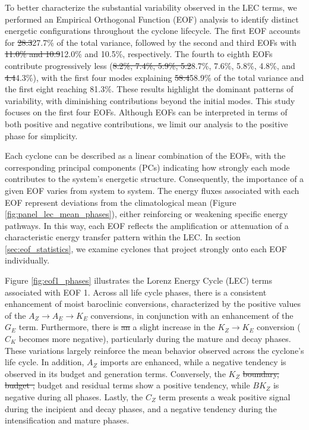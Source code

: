 \documentclass[pdflatex,sn-chicago]{sn-jnl}%
\makeatletter
\theoremstyle{plain}
\theoremstyle{definition}
\theoremstyle{remark}
\theoremstyle{definition}
\providecommand{\DIFaddtex}[1]{{\protect\color{blue}#1}} %
\providecommand{\DIFdeltex}[1]{{\protect\color{red}\sout{#1}}} %
\providecommand{\DIFaddbegin}{} %
\providecommand{\DIFaddend}{} %
\providecommand{\DIFdelbegin}{} %
\providecommand{\DIFdelend}{} %
\providecommand{\DIFadd}[1]{\texorpdfstring{\DIFaddtex{#1}}{#1}} %
\providecommand{\DIFdel}[1]{\texorpdfstring{\DIFdeltex{#1}}{}} %
\let\sout@orig\sout %
\renewcommand{\sout}[1]{\ifmmode\text{\sout@orig{\ensuremath{#1}}}\else\sout@orig{#1}\fi} %
\makeatother
\begin{document}
To better characterize the substantial variability observed in the LEC terms, we performed an Empirical Orthogonal Function (EOF) analysis to identify distinct energetic configurations throughout the cyclone lifecycle. The first EOF accounts for \DIFdelbegin \DIFdel{28.3}\DIFdelend \DIFaddbegin \DIFadd{27.7}\DIFaddend \% of the total variance, followed by the second and third EOFs with \DIFdelbegin \DIFdel{11.0\% and 10.9}\DIFdelend \DIFaddbegin \DIFadd{12.0\% and 10.5}\DIFaddend \%, respectively. The fourth to eighth EOFs contribute progressively less (\DIFdelbegin \DIFdel{8.2\%, 7.4\%, 5.9\%, 5.2}\DIFdelend \DIFaddbegin \DIFadd{8.7\%, 7.6\%, 5.8\%, 4.8}\DIFaddend \%, and \DIFdelbegin \DIFdel{4.4}\DIFdelend \DIFaddbegin \DIFadd{4.3}\DIFaddend \%), with the first four modes explaining \DIFdelbegin \DIFdel{58.4}\DIFdelend \DIFaddbegin \DIFadd{58.9}\DIFaddend \% of the total variance and the first eight reaching 81.3\%. These results highlight the dominant patterns of variability, with diminishing contributions beyond the initial modes. This study focuses on the first four EOFs. Although EOFs can be interpreted in terms of both positive and negative contributions, we limit our analysis to the positive phase for simplicity.

Each cyclone can be described as a linear combination of the EOFs, with the corresponding principal components (PCs) indicating how strongly each mode contributes to the system’s energetic structure. Consequently, the importance of a given EOF varies from system to system. The energy fluxes associated with each EOF represent deviations from the climatological mean (Figure \ref{fig:panel_lec_mean_phases}), either reinforcing or weakening specific energy pathways. In this way, each EOF reflects the amplification or attenuation of a characteristic energy transfer pattern within the LEC. In section \ref{sec:eof_statistics}, we examine cyclones that project strongly onto each EOF individually.

Figure \ref{fig:eof1_phases} illustrates the Lorenz Energy Cycle (LEC) terms associated with EOF 1. Across all life cycle phases, there is a consistent enhancement of moist baroclinic conversions, characterized by the positive values of the $A_Z \rightarrow A_E \rightarrow K_E$ conversions, in conjunction with an enhancement of the $G_E$ term. Furthermore, there is \DIFdelbegin \DIFdel{an }\DIFdelend \DIFaddbegin \DIFadd{a slight }\DIFaddend increase in the $K_Z \rightarrow K_E$ conversion ($C_K$ becomes more negative), particularly during the mature and decay phases. These variations largely reinforce the mean behavior observed across the cyclone's life cycle. In addition, $A_Z$ imports are enhanced, while a negative tendency is observed in its budget and generation terms. Conversely, the $K_Z$  \DIFdelbegin \DIFdel{boundary, budget , }\DIFdelend \DIFaddbegin \DIFadd{budget }\DIFaddend and residual terms show a positive tendency\DIFaddbegin \DIFadd{, while $BK_Z$ is negative during all phases}\DIFaddend . Lastly, the $C_Z$ term presents a weak positive signal during the incipient and decay phases, and a negative tendency during the intensification and mature phases.
\end{document}
